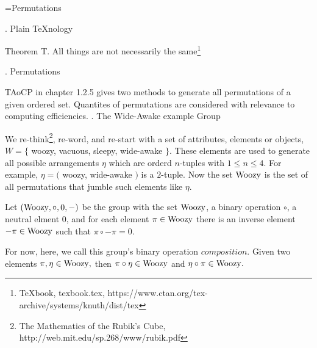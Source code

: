 
\def\a{\left(\matrix }
\def\b{\cr}
\def\c{\right)}

\def\d{\footnote*{The Mathematics of the Rubik’s Cube,
  http://web.mit.edu/sp.268/www/rubik.pdf}}
\def\f{\footnote*{TAoCP chapter 1.2.5,
  https://www-cs-faculty.stanford.edu/\%7Eknuth/taocp.html}}
\def\g{\footnote*{\TeX book, texbook.tex,
  https://www.ctan.org/tex-archive/systems/knuth/dist/tex}}
%
\def\e{\bigskip}
\def\R{\hbox{Woozy}}
\def\*{\circ}
%
\vsize=300pt %
\hsize=480pt %

\footline={\tenrm Permutations\quad\dotfill\quad \folio}
\raggedright

. Plain \TeX nology %

\proclaim Theorem T. All things are not necessarily the same\g

\def\strutdepth{\dp\strutbox}
\def\marginalstar{\strut\vadjust{\kern-\strutdepth\specialstar}}
\def\specialstar{\vtop to \strutdepth{
  \baselineskip\strutdepth
  \vss\llap{* }\null}}

. Permutations

\e
TAoCP in chapter 1.2.5 gives two methods to generate
all permutations of a given ordered set.
Quantites of permutations are considered
with relevance to computing efficiencies.
. The Wide-Awake example Group

\e
We re-think\d, re-word, and re-start
with a set of attributes, elements or objects,\break
$W=\{$ woozy, vacuous, sleepy, wide-awake $\}.$
These elements are used to generate all possible
arrangements $\eta$ which are orderd $n$-tuples with
$1\le n\le4.$
For example, $\eta=($ woozy, wide-awake $)$ is a $2$-tuple.
Now the set $\R$ is the set of all permutations that jumble
such elements like $\eta.$

\e
Let $(\R,\*,0,-)$ be the group with the set $\R$, a binary
operation $\*$, a neutral elment $0$, and
for each element $\pi\in\R$ there is an inverse element
$-\pi\in\R$ such that $\pi\*-\pi=0.$

\e
For now, here, we call this group's binary operation $composition$.
Given two elements
$\pi,\eta\in\R,$ then
$\pi\*\eta\in\R$ and $\eta\*\pi\in\R.$



